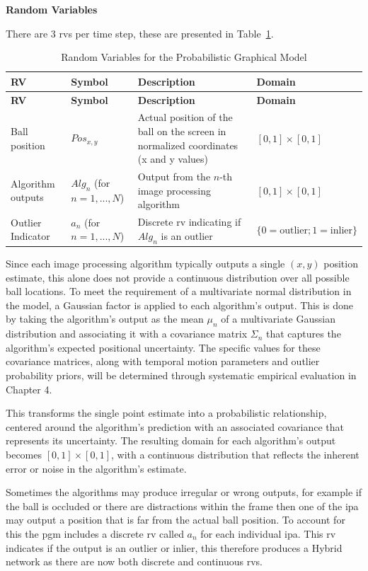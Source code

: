 \documentclass[12pt,a4paper]{article}
\begin{document}
\textbf{Random Variables}

There are 3 \acs{rv}s per time step, these are presented in Table~\ref{tab:rvs}. 

\begin{longtable}{p{} p{} p{} p{}}
\caption{Random Variables for the Probabilistic Graphical Model} \label{tab:rvs} \\
\hline
\textbf{RV} & \textbf{Symbol} & \textbf{Description} & \textbf{Domain} \\
\hline
\endfirsthead
\hline
\textbf{RV} & \textbf{Symbol} & \textbf{Description} & \textbf{Domain} \\
\hline
\endhead
\hline
\endfoot
\hline
\endlastfoot
		Ball position & $Pos_{x,y}$ & Actual position of the ball on the screen in normalized coordinates (x and y values) & $[0, 1] \times [0, 1]$ \\
		Algorithm outputs & $Alg_n$ (for $n=1,...,N$) & Output from the $n$-th image processing algorithm & $[0, 1] \times [0, 1]$ \\
		Outlier Indicator & $a_n$ (for $n=1,...,N$) & Discrete \acs{rv} indicating if $Alg_n$ is an outlier & $\{0 = \text{outlier}; 1 = \text{inlier}\}$ \\
\end{longtable}

Since each image processing algorithm typically outputs a single $(x, y)$ position estimate, this alone does not provide a continuous distribution over all possible ball locations. To meet the requirement of a multivariate normal distribution in the model, a Gaussian factor is applied to each algorithm’s output. This is done by taking the algorithm's output as the mean $\mu_n$ of a multivariate Gaussian distribution and associating it with a covariance matrix $\Sigma_n$ that captures the algorithm's expected positional uncertainty. The specific values for these covariance matrices, along with temporal motion parameters and outlier probability priors, will be determined through systematic empirical evaluation in Chapter 4.

This transforms the single point estimate into a probabilistic relationship, centered around the algorithm's prediction with an associated covariance that represents its uncertainty. The resulting domain for each algorithm’s output becomes $[0,1]\times[0,1]$, with a continuous distribution that reflects the inherent error or noise in the algorithm's estimate.

Sometimes the algorithms may produce irregular or wrong outputs, for example if the ball is occluded or there are distractions within the frame then one of the \acs{ipa} may output a position that is far from the actual ball position. To account for this the \acs{pgm} includes a discrete \acs{rv} called $a_n$ for each individual \acs{ipa}. This \acs{rv} indicates if the output is an outlier or inlier, this therefore produces a Hybrid network as there are now both discrete and continuous \acs{rv}s.
\end{document}
